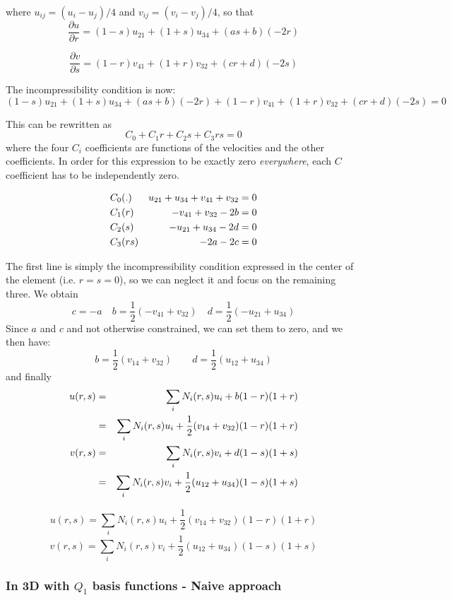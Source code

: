where $u_{ij}=(u_i-u_j)/4$ and $v_{ij}=(v_i-v_j)/4$, so that
\[
\frac{\partial u}{\partial r}=
(1-s) u_{21} + (1+s) u_{34} 
+ (a s + b) (-2r)
\]

\[
\frac{\partial v}{\partial s}=
(1-r) v_{41} + (1+r) v_{32}
+ (c r + d)(-2s)
\]


The incompressibility condition is now:
\[
(1-s) u_{21} + (1+s) u_{34} 
+ (a s + b) (-2r) +
(1-r) v_{41} + (1+r) v_{32}
+ (c r + d)(-2s)
=0
\]

This can be rewritten as
\[
C_0  + C_1 r + C_2 s + C_3 rs = 0
\]
where the four $C_i$ coefficients are functions of the velocities and the other coefficients.
In order for this expression to be exactly zero {\it everywhere}, each $C$ coefficient has
to be independently zero.

\begin{eqnarray}
C_0   &(.)  &  u_{21} + u_{34} + v_{41} + v_{32} =0\nonumber\\ 
C_1   &(r)  &  -v_{41} + v_{32} -2b =0\nonumber\\ 
C_2   &(s)  &  -u_{21} + u_{34} -2d =0 \nonumber\\ 
C_3   &(rs) &  -2a -2c =0\nonumber 
\end{eqnarray}

The first line is simply the incompressibility condition
expressed in the center of the element (i.e. $r=s=0$),
so we can neglect it and focus on the remaining three.
We obtain
\[
c=-a
\quad
b=\frac{1}{2}(-v_{41} + v_{32})
\quad
d=\frac{1}{2} (-u_{21} + u_{34})
\]
Since $a$ and $c$ and not otherwise constrained, we can set them to zero, and we then have:
\[
b=\frac{1}{2}(v_{14} + v_{32})
\quad\quad
d=\frac{1}{2} (u_{12} + u_{34})
\]
and finally
\begin{eqnarray}
u(r,s)
&=&\sum_i N_i(r,s) u_i + b(1-r)(1+r) \nonumber\\
&=&\sum_i N_i(r,s) u_i + \frac{1}{2}(v_{14} + v_{32})(1-r)(1+r) \nonumber\\
v(r,s)
&=&\sum_i N_i(r,s) v_i + d(1-s)(1+s) \nonumber\\
&=&\sum_i N_i(r,s) v_i + \frac{1}{2} (u_{12} + u_{34})(1-s)(1+s) \nonumber
\end{eqnarray}

\[
\boxed{
u(r,s)=\sum_i N_i(r,s) u_i + \frac{1}{2}(v_{14} + v_{32})(1-r)(1+r) 
}
\]
\[
\boxed{
v(r,s)
=\sum_i N_i(r,s) v_i + \frac{1}{2} (u_{12} + u_{34})(1-s)(1+s) 
}
\]


\subsubsection{In 3D with $Q_1$ basis functions - Naive approach}

